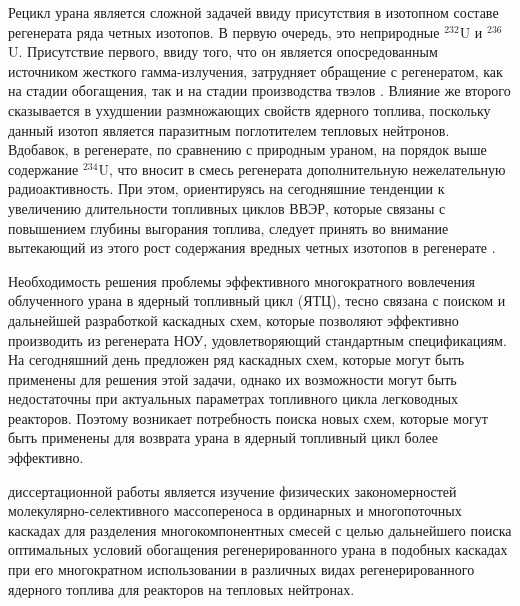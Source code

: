 Рецикл урана является сложной задачей ввиду присутствия в изотопном составе регенерата ряда четных изотопов. В первую очередь, это неприродные $^{232}$U и $^{236}$U. Присутствие первого, ввиду того, что он является опосредованным источником жесткого гамма-излучения, затрудняет обращение с регенератом, как на стадии обогащения, так и на стадии производства твэлов \cite{matveevUran232EgoVliyanie1985}. Влияние же второго сказывается в ухудшении размножающих свойств ядерного топлива, поскольку данный изотоп является паразитным поглотителем тепловых нейтронов. Вдобавок, в регенерате, по сравнению с природным ураном, на порядок выше содержание $^{234}$U, что вносит в смесь регенерата дополнительную нежелательную радиоактивность. При этом, ориентируясь на сегодняшние тенденции к увеличению длительности топливных циклов ВВЭР, которые связаны с повышением глубины выгорания топлива, следует принять во внимание вытекающий из этого рост содержания вредных четных изотопов в регенерате \cite{smirnovEvolutionIsotopicComposition2012}.

Необходимость решения проблемы эффективного многократного вовлечения облученного урана в ядерный топливный цикл (ЯТЦ), тесно связана с поиском и дальнейшей разработкой каскадных схем, которые позволяют эффективно производить из регенерата НОУ, удовлетворяющий стандартным спецификациям.
На сегодняшний день предложен ряд каскадных схем, которые могут быть применены для решения этой задачи, однако их возможности могут быть недостаточны при актуальных параметрах топливного цикла легководных реакторов. Поэтому возникает потребность поиска новых схем, которые могут быть применены для возврата урана в ядерный топливный цикл более эффективно. 


{\aim} диссертационной работы является изучение физических закономерностей
молекулярно-селективного массопереноса в ординарных и многопоточных каскадах
для разделения многокомпонентных смесей с целью дальнейшего поиска
оптимальных условий обогащения регенерированного урана в подобных каскадах при
его многократном использовании в различных видах регенерированного ядерного
топлива для реакторов на тепловых нейтронах. 

